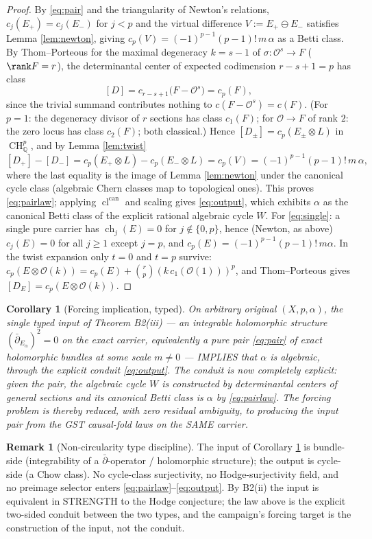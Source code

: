 \documentclass[11pt]{article}
\newtheorem{corollary}[theorem]{Corollary}
\theoremstyle{definition}
\newtheorem{remark}[theorem]{Remark}
\newcommand{\ch}{\operatorname{ch}}
\newcommand{\cl}{\operatorname{cl}^{\operatorname{can}}}
\newcommand{\CH}{\operatorname{CH}}
\newcommand{\ddbar}{\bar\partial}
\newcommand{\tensor}{\otimes}
\newcommand{\Oo}{\mathcal O}
\begin{document}
\begin{proof}
By \eqref{eq:pair} and the triangularity of Newton's relations,
$c_j(E_+)=c_j(E_-)$ for $j<p$ and the virtual difference
$V:=E_+\ominus E_-$ satisfies Lemma \ref{lem:newton}, giving
$c_p(V)=(-1)^{p-1}(p-1)!\,m\,\alpha$ as a Betti class. By
Thom--Porteous for the maximal degeneracy $k=s-1$ of
$\sigma:\Oo^s\to F$ ($\rank F=r$), the determinantal center of
expected codimension $r-s+1=p$ has class
\[
[D]=c_{r-s+1}\bigl(F-\Oo^{s}\bigr)=c_p(F),
\]
since the trivial summand contributes nothing to $c(F-\Oo^s)=c(F)$.
(For $p=1$: the degeneracy divisor of $r$ sections has class
$c_1(F)$; for $\Oo\to F$ of rank $2$: the zero locus has class
$c_2(F)$; both classical.) Hence
$[D_\pm]=c_p(E_\pm\tensor L)$ in $\CH^p_{\mathbb Q}$, and by Lemma
\ref{lem:twist}
\[
[D_+]-[D_-]=c_p(E_+\tensor L)-c_p(E_-\tensor L)
=c_p(V)=(-1)^{p-1}(p-1)!\,m\,\alpha,
\]
where the last equality is the image of Lemma \ref{lem:newton} under
the canonical cycle class (algebraic Chern classes map to topological
ones). This proves \eqref{eq:pairlaw}; applying $\cl$ and scaling
gives \eqref{eq:output}, which exhibits $\alpha$ as the canonical
Betti class of the explicit rational algebraic cycle $W$.
For \eqref{eq:single}: a single pure carrier has
$\ch_j(E)=0$ for $j\notin\{0,p\}$, hence (Newton, as above)
$c_j(E)=0$ for all $j\ge1$ except $j=p$, and
$c_p(E)=(-1)^{p-1}(p-1)!\,m\alpha$. In the twist expansion only
$t=0$ and $t=p$ survive:
$c_p(E\tensor\Oo(k))=c_p(E)+\binom{r}{p}(k\,c_1(\Oo(1)))^{p}$, and
Thom--Porteous gives $[D_E]=c_p(E\tensor\Oo(k))$.
\end{proof}

\begin{corollary}[Forcing implication, typed]
\label{cor:forcing}
On arbitrary original $(X,p,\alpha)$, the single typed input of
Theorem B2(iii) --- an integrable holomorphic structure
$(\ddbar_{E_\alpha})^2=0$ on the exact carrier, equivalently a pure
pair \eqref{eq:pair} of exact holomorphic bundles at some scale
$m\ne0$ --- IMPLIES that $\alpha$ is algebraic, through the explicit
conduit \eqref{eq:output}. The conduit is now completely explicit:
given the pair, the algebraic cycle $W$ is constructed by
determinantal centers of general sections and its canonical Betti
class is $\alpha$ by \eqref{eq:pairlaw}. The forcing problem is
thereby reduced, with zero residual ambiguity, to producing the input
pair from the GST causal-fold laws on the SAME carrier.
\end{corollary}

\begin{remark}[Non-circularity type discipline]
The input of Corollary \ref{cor:forcing} is bundle-side
(integrability of a $\ddbar$-operator / holomorphic structure); the
output is cycle-side (a Chow class). No cycle-class surjectivity,
no Hodge-surjectivity field, and no preimage selector enters
\eqref{eq:pairlaw}--\eqref{eq:output}. By B2(ii) the input is
equivalent in STRENGTH to the Hodge conjecture; the law above is the
explicit two-sided conduit between the two types, and the campaign's
forcing target is the construction of the input, not the conduit.
\end{remark}
\end{document}
